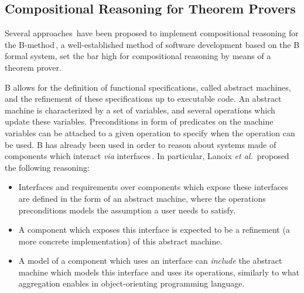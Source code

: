 \subsection{Compositional Reasoning for Theorem Provers}
\label{subsec:sota:peff}
Several
approaches\,\cite{souquieres2005verifying,chouali2006proving,lanoix:hal-00105041}
have been proposed to implement compositional reasoning for the
B-method\,\cite{abrial2005b}, a well-established method of software development
based on the B formal system, set the bar high for compositional reasoning by
means of a theorem prover. 

B allows for the definition of functional specifications, called abstract
machines, and the refinement of these specifications up to executable code.
%
An abstract machine is characterized by a set of variables, and several
operations which update these variables. Preconditions in form of predicates on
the machine variables can be attached to a given operation to specify when the
operation can be used.
%
B has already been used in order to reason about systems made of components
which interact \emph{via}
interfaces\,\cite{souquieres2005verifying,chouali2006proving,lanoix:hal-00105041}.
%
In particular, Lanoix \emph{et al.}\,\cite{lanoix:hal-00105041} proposed the
following reasoning:
%
\begin{itemize}
\item Interfaces and requirements over components which expose these interfaces
  are defined in the form of an abstract machine, where the operations
  preconditions models the assumption a user needs to satisfy.
\item A component which exposes this interface is expected to be a refinement (a
  more concrete implementation) of this abstract machine.
\item A model of a component which uses an interface can \emph{include} the
  abstract machine which models this interface and uses its operations,
  similarly to what aggregation enables in object-orienting programming
  language.
\end{itemize}


